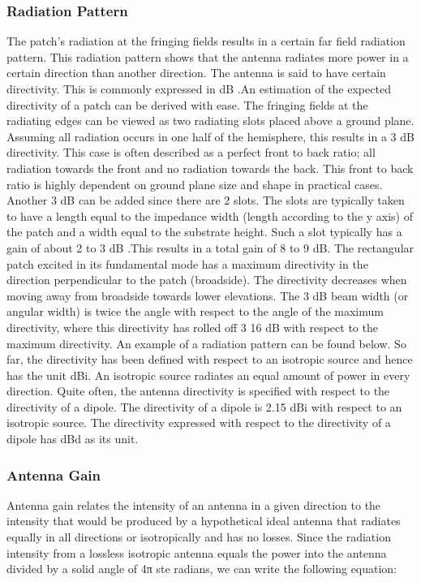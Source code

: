 \documentclass[12pt]{article}
\begin{document}
      \subsubsection{Radiation Pattern}
       \justify
        The patch's radiation at the fringing fields results in a certain far field radiation pattern. This radiation pattern shows that the antenna radiates more power in a certain direction than another direction. The antenna is said to have certain directivity. This is commonly expressed in dB .An estimation of the expected directivity of a patch can be derived with ease. The fringing fields at the radiating edges can be viewed as two radiating slots placed above a ground plane. Assuming all radiation occurs in one half of the hemisphere, this results in a 3 dB directivity. This case is often described as a perfect front to back ratio; all radiation towards the front and no radiation towards the back. This front to back ratio is highly dependent on ground plane size and shape in practical cases. Another 3 dB can be added since there are 2 slots. The slots are typically taken to have a length equal to the impedance width (length according to the y axis) of the patch and a width equal to the substrate height. Such a slot typically has a gain of about 2 to 3 dB .This results in a total gain of 8 to 9 dB. The rectangular patch excited in its fundamental mode has a maximum directivity in the direction perpendicular to the patch (broadside). The directivity decreases when moving away from broadside towards lower elevations. The 3 dB beam width (or angular width) is twice the angle with respect to the angle of the maximum directivity, where this directivity has rolled off 3 16 dB with respect to the maximum directivity. An example of a radiation pattern can be found below. So far, the directivity has been defined with respect to an isotropic source and hence has the unit dBi. An isotropic source radiates an equal amount of power in every direction. Quite often, the antenna directivity is specified with respect to the directivity of a dipole. The  directivity of a dipole is 2.15 dBi with respect to an isotropic source. The directivity expressed with respect to the directivity of a dipole has dBd as its unit.

        \subsubsection{Antenna Gain}
         \justify
	        Antenna gain relates the intensity of an antenna in a given direction to the intensity that would be produced by a hypothetical ideal antenna that radiates equally in all directions or isotropically and has no losses. Since the radiation intensity from a lossless isotropic antenna equals the power into the antenna divided by a solid angle of 4π ste radians, we can write the following equation:
	
\end{document}
